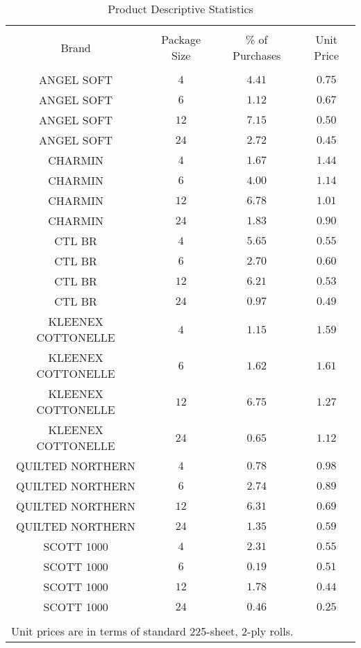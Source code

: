 
\begin{table}[!htbp] \centering 
  \caption{Product Descriptive Statistics} 
  \label{tab:prodSummary} 
\begin{tabular}{@{\extracolsep{5pt}} cccc} 
\\[-1.8ex]\hline 
\hline \\[-1.8ex] 
Brand & Package Size & \% of Purchases & Unit Price \\ 
\hline \\[-1.8ex] 
ANGEL SOFT & $4$ & $4.41$ & $0.75$ \\ 
ANGEL SOFT & $6$ & $1.12$ & $0.67$ \\ 
ANGEL SOFT & $12$ & $7.15$ & $0.50$ \\ 
ANGEL SOFT & $24$ & $2.72$ & $0.45$ \\ 
CHARMIN & $4$ & $1.67$ & $1.44$ \\ 
CHARMIN & $6$ & $4.00$ & $1.14$ \\ 
CHARMIN & $12$ & $6.78$ & $1.01$ \\ 
CHARMIN & $24$ & $1.83$ & $0.90$ \\ 
CTL BR & $4$ & $5.65$ & $0.55$ \\ 
CTL BR & $6$ & $2.70$ & $0.60$ \\ 
CTL BR & $12$ & $6.21$ & $0.53$ \\ 
CTL BR & $24$ & $0.97$ & $0.49$ \\ 
KLEENEX COTTONELLE & $4$ & $1.15$ & $1.59$ \\ 
KLEENEX COTTONELLE & $6$ & $1.62$ & $1.61$ \\ 
KLEENEX COTTONELLE & $12$ & $6.75$ & $1.27$ \\ 
KLEENEX COTTONELLE & $24$ & $0.65$ & $1.12$ \\ 
QUILTED NORTHERN & $4$ & $0.78$ & $0.98$ \\ 
QUILTED NORTHERN & $6$ & $2.74$ & $0.89$ \\ 
QUILTED NORTHERN & $12$ & $6.31$ & $0.69$ \\ 
QUILTED NORTHERN & $24$ & $1.35$ & $0.59$ \\ 
SCOTT 1000 & $4$ & $2.31$ & $0.55$ \\ 
SCOTT 1000 & $6$ & $0.19$ & $0.51$ \\ 
SCOTT 1000 & $12$ & $1.78$ & $0.44$ \\ 
SCOTT 1000 & $24$ & $0.46$ & $0.25$ \\ 
\hline \\[-1.8ex] 
\multicolumn{4}{l}{Unit prices are in terms of standard 225-sheet, 2-ply rolls.} \\ 
\end{tabular} 
\end{table} 
